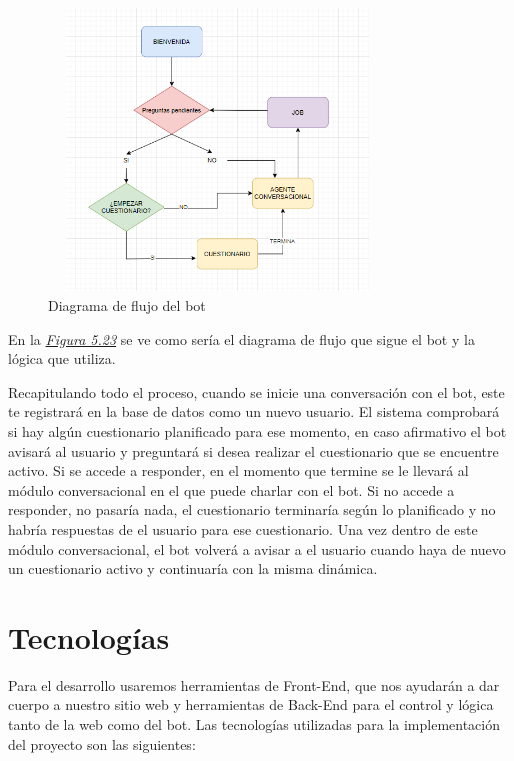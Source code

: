 \begin{figure}[!ht]
    \centering
    \includegraphics[width=0.8\textwidth, height=7.5cm]{imagenes/flujo.png}
    \caption{ Diagrama de flujo del bot}
    \label{fig:flujo}
\end{figure}
\vspace{1cm}

En la \textit{\hyperref[fig:flujo]{Figura 5.23}} se ve como sería el diagrama de flujo que sigue el bot y la lógica que utiliza. 

Recapitulando todo el proceso, cuando se inicie una conversación con el bot, este te registrará en la base de datos como un nuevo usuario. El sistema comprobará si hay algún cuestionario planificado para ese momento, en caso afirmativo el bot avisará al usuario y preguntará si desea realizar el cuestionario que se encuentre activo. Si se accede a responder, en el momento que termine se le llevará al módulo conversacional en el que puede charlar con el bot. Si no accede a responder, no pasaría nada, el cuestionario terminaría según lo planificado y no habría respuestas de el usuario para ese cuestionario. Una vez dentro de este módulo conversacional, el bot volverá a avisar a el usuario cuando haya de nuevo un cuestionario activo y continuaría con la misma dinámica.

\section{Tecnologías}
Para el desarrollo usaremos herramientas de Front-End, que nos ayudarán a dar cuerpo a nuestro sitio web y herramientas de Back-End para el control y lógica tanto de la web como del bot. Las tecnologías utilizadas para la implementación del proyecto son las siguientes:

